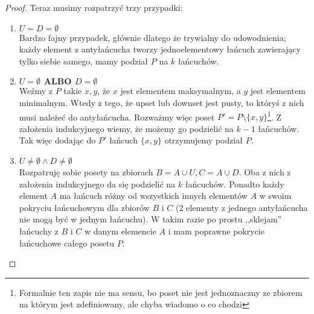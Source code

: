 \begin{proof}
	Teraz musimy rozpatrzyć trzy przypadki:
	\begin{enumerate}
		\item $U = D = \emptyset$ \\
		      Bardzo fajny przypadek, głównie dlatego że trywialny do udowodnienia; każdy element z antyłańcucha tworzy jednoelementowy łańcuch zawierający tylko siebie samego, mamy podział $P$ na $k$ łańcuchów.
		\item $U = \emptyset \hspace{5pt} \mathbf{ALBO} \hspace{5pt} D = \emptyset$ \\
		      Weźmy z \(P\) takie \(x, y\), że \(x\) jest elementem maksymalnym, a \(y\) jest elementem minimalnym. Wtedy z tego, że upset lub downset jest pusty, to któryś z nich musi należeć do antyłańcucha. Rozważmy więc poset \(P' = P\setminus \{x,y \}\)\footnote{Formalnie ten zapis nie ma sensu, bo poset nie jest jednoznaczny ze zbiorem na którym jest zdefiniowany, ale chyba wiadomo o co chodzi}. Z założenia indukcyjnego wiemy, że możemy go podzielić na \(k - 1 \) łańcuchów. Tak więc dodając do \(P'\) łańcuch \( \{x, y\} \) otrzymujemy podział \(P\).
		\item $U \not = \emptyset \wedge D \not = \emptyset$ \\
		      Rozpatruję sobie posety na zbiorach $B = A \cup U, C = A \cup D$. Oba z nich z założenia indukcyjnego da się podzielić na $k$ łańcuchów. Ponadto każdy element $A$ ma łańcuch różny od wszystkich innych elementów $A$ w swoim pokryciu łańcuchowym dla zbiorów $B$ i $C$ (2 elementy z jednego antyłańcucha nie mogą być w jednym łańcuchu). W takim razie po prostu ,,sklejam'' łańcuchy z $B$ i $C$ w danym elemencie $A$ i mam poprawne pokrycie łańcuchowe całego posetu $P$.
	\end{enumerate}

\end{proof} %
